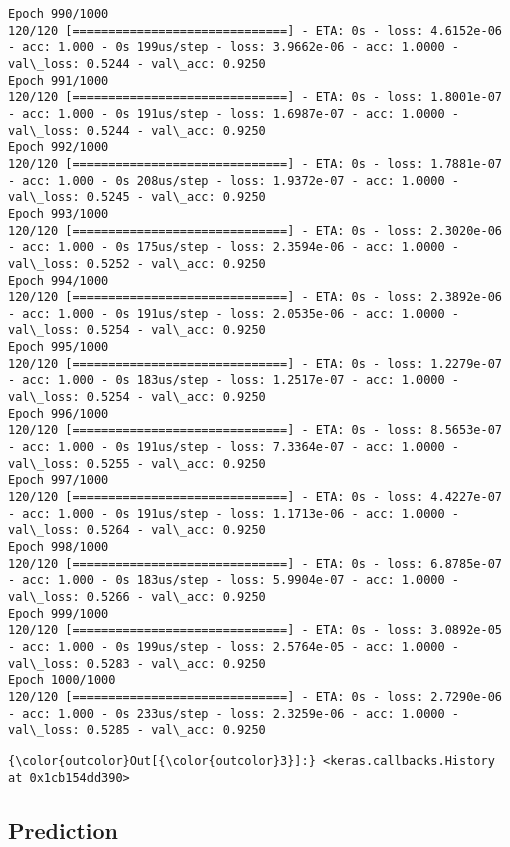 \documentclass[11pt]{article}
\begin{document}
\begin{Verbatim}[commandchars=\\\{\}]
Epoch 990/1000
120/120 [==============================] - ETA: 0s - loss: 4.6152e-06 - acc: 1.000 - 0s 199us/step - loss: 3.9662e-06 - acc: 1.0000 - val\_loss: 0.5244 - val\_acc: 0.9250
Epoch 991/1000
120/120 [==============================] - ETA: 0s - loss: 1.8001e-07 - acc: 1.000 - 0s 191us/step - loss: 1.6987e-07 - acc: 1.0000 - val\_loss: 0.5244 - val\_acc: 0.9250
Epoch 992/1000
120/120 [==============================] - ETA: 0s - loss: 1.7881e-07 - acc: 1.000 - 0s 208us/step - loss: 1.9372e-07 - acc: 1.0000 - val\_loss: 0.5245 - val\_acc: 0.9250
Epoch 993/1000
120/120 [==============================] - ETA: 0s - loss: 2.3020e-06 - acc: 1.000 - 0s 175us/step - loss: 2.3594e-06 - acc: 1.0000 - val\_loss: 0.5252 - val\_acc: 0.9250
Epoch 994/1000
120/120 [==============================] - ETA: 0s - loss: 2.3892e-06 - acc: 1.000 - 0s 191us/step - loss: 2.0535e-06 - acc: 1.0000 - val\_loss: 0.5254 - val\_acc: 0.9250
Epoch 995/1000
120/120 [==============================] - ETA: 0s - loss: 1.2279e-07 - acc: 1.000 - 0s 183us/step - loss: 1.2517e-07 - acc: 1.0000 - val\_loss: 0.5254 - val\_acc: 0.9250
Epoch 996/1000
120/120 [==============================] - ETA: 0s - loss: 8.5653e-07 - acc: 1.000 - 0s 191us/step - loss: 7.3364e-07 - acc: 1.0000 - val\_loss: 0.5255 - val\_acc: 0.9250
Epoch 997/1000
120/120 [==============================] - ETA: 0s - loss: 4.4227e-07 - acc: 1.000 - 0s 191us/step - loss: 1.1713e-06 - acc: 1.0000 - val\_loss: 0.5264 - val\_acc: 0.9250
Epoch 998/1000
120/120 [==============================] - ETA: 0s - loss: 6.8785e-07 - acc: 1.000 - 0s 183us/step - loss: 5.9904e-07 - acc: 1.0000 - val\_loss: 0.5266 - val\_acc: 0.9250
Epoch 999/1000
120/120 [==============================] - ETA: 0s - loss: 3.0892e-05 - acc: 1.000 - 0s 199us/step - loss: 2.5764e-05 - acc: 1.0000 - val\_loss: 0.5283 - val\_acc: 0.9250
Epoch 1000/1000
120/120 [==============================] - ETA: 0s - loss: 2.7290e-06 - acc: 1.000 - 0s 233us/step - loss: 2.3259e-06 - acc: 1.0000 - val\_loss: 0.5285 - val\_acc: 0.9250

    \end{Verbatim}

\begin{Verbatim}[commandchars=\\\{\}]
{\color{outcolor}Out[{\color{outcolor}3}]:} <keras.callbacks.History at 0x1cb154dd390>
\end{Verbatim}
            
    \subsection{Prediction}\label{prediction}
\end{document}
